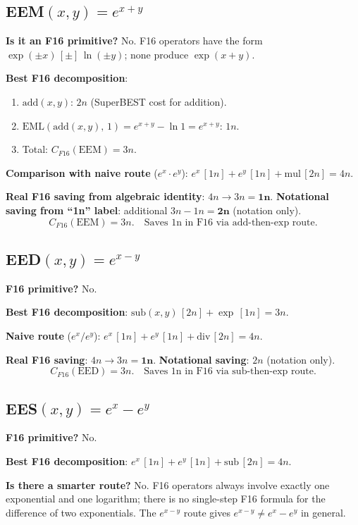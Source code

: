 \documentclass[11pt]{article}
\begin{document}
\subsection{EEM$(x,y) = e^{x+y}$}

\textbf{Is it an F16 primitive?} No. F16 operators have the form $\exp(\pm x)\,[\pm]\,\ln(\pm y)$;
none produce $\exp(x+y)$.

\textbf{Best F16 decomposition}:
\begin{enumerate}
  \item $\mathrm{add}(x,y)$: $2n$ (SuperBEST cost for addition).
  \item $\mathrm{EML}(\mathrm{add}(x,y),\,1) = e^{x+y} - \ln 1 = e^{x+y}$: $1n$.
  \item Total: $C_{F16}(\mathrm{EEM}) = 3n$.
\end{enumerate}

\textbf{Comparison with naive route} ($e^x\cdot e^y$):
$e^x\,[1n] + e^y\,[1n] + \mathrm{mul}\,[2n] = 4n$.

\textbf{Real F16 saving from algebraic identity}: $4n\to3n = \mathbf{1n}$.
\textbf{Notational saving from ``1n'' label}: additional $3n-1n = \mathbf{2n}$ (notation only).
\[
\boxed{C_{F16}(\mathrm{EEM}) = 3n.\quad\text{Saves 1n in F16 via add-then-exp route.}}
\]

\subsection{EED$(x,y) = e^{x-y}$}

\textbf{F16 primitive?} No.

\textbf{Best F16 decomposition}:
$\mathrm{sub}(x,y)\,[2n] + \exp\,[1n] = 3n$.

\textbf{Naive route} ($e^x/e^y$):
$e^x\,[1n] + e^y\,[1n] + \mathrm{div}\,[2n] = 4n$.

\textbf{Real F16 saving}: $4n\to3n = \mathbf{1n}$.
\textbf{Notational saving}: $2n$ (notation only).
\[
\boxed{C_{F16}(\mathrm{EED}) = 3n.\quad\text{Saves 1n in F16 via sub-then-exp route.}}
\]

\subsection{EES$(x,y) = e^x - e^y$}

\textbf{F16 primitive?} No.

\textbf{Best F16 decomposition}:
$e^x\,[1n] + e^y\,[1n] + \mathrm{sub}\,[2n] = 4n$.

\textbf{Is there a smarter route?} No. F16 operators always involve exactly one exponential
and one logarithm; there is no single-step F16 formula for the difference of two exponentials.
The $e^{x-y}$ route gives $e^{x-y}\neq e^x - e^y$ in general.
\end{document}
